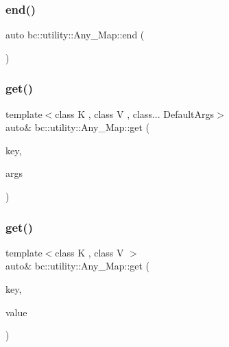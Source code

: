\mbox{\label{classbc_1_1utility_1_1Any__Map_ad4e665fb716c5fbaedd9e7146d79e991}} 
\subsubsection{\texorpdfstring{end()}{end()}\hspace{0.1cm}{\footnotesize\ttfamily [2/2]}}
{\footnotesize\ttfamily auto bc\+::utility\+::\+Any\+\_\+\+Map\+::end (\begin{DoxyParamCaption}{ }\end{DoxyParamCaption})\hspace{0.3cm}{\ttfamily [inline]}}

\mbox{\label{classbc_1_1utility_1_1Any__Map_a45119ffc4e78ca50dc4790c63cc42590}} 
\subsubsection{\texorpdfstring{get()}{get()}\hspace{0.1cm}{\footnotesize\ttfamily [1/2]}}
{\footnotesize\ttfamily template$<$class K , class V , class... Default\+Args$>$ \\
auto\& bc\+::utility\+::\+Any\+\_\+\+Map\+::get (\begin{DoxyParamCaption}\item[{\hyperlink{structbc_1_1utility_1_1Any__Key}{Any\+\_\+\+Key}$<$ K, V $>$}]{key,  }\item[{Default\+Args \&\&...}]{args }\end{DoxyParamCaption})\hspace{0.3cm}{\ttfamily [inline]}}

\mbox{\label{classbc_1_1utility_1_1Any__Map_a14d3fe8ca3fc98def4e9b61d7aa082fa}} 
\subsubsection{\texorpdfstring{get()}{get()}\hspace{0.1cm}{\footnotesize\ttfamily [2/2]}}
{\footnotesize\ttfamily template$<$class K , class V $>$ \\
auto\& bc\+::utility\+::\+Any\+\_\+\+Map\+::get (\begin{DoxyParamCaption}\item[{\hyperlink{structbc_1_1utility_1_1Any__Key}{Any\+\_\+\+Key}$<$ K, V $>$}]{key,  }\item[{V \&\&}]{value }\end{DoxyParamCaption})\hspace{0.3cm}{\ttfamily [inline]}}

